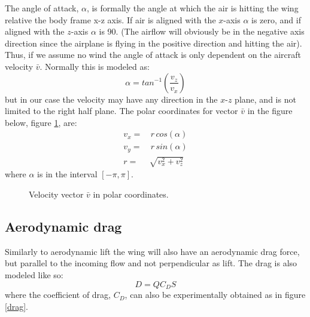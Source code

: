 The angle of attack, $\alpha$, is formally the angle at which the air is hitting the wing relative the body frame x-z axis.
If air is aligned with the $x$-axis $\alpha$ is zero, and if aligned with the $z$-axis $\alpha$ is 90.
(The airflow will obviously be in the negative axis direction since the airplane is flying in the positive direction and hitting the air).
Thus, if we assume no wind the angle of attack is only dependent on the aircraft velocity $\bar{v}$.
Normally this is modeled as:
\begin{equation}
    \alpha = tan^{-1}(\frac{v_z}{v_x})
    \label{eq:aoa}
\end{equation}
but in our case the velocity may have any direction in the $x$-$z$ plane, and is not limited to the right half plane.
The polar coordinates for vector $\bar{v}$ in the figure below, figure \ref{polar}, are:
\begin{equation}\begin{split}
    v_x =& \, r \, cos(\alpha) \\
    v_y =& \, r \, sin(\alpha) \\
    r =& \sqrt{v_x^2 + v_z^2}
    \label{eq:polar}
\end{split}\end{equation}
where $\alpha$ is in the interval $[-\pi,\pi]$.

\begin{figure}[h]
    \center
    
    \caption{Velocity vector $\bar{v}$ in polar coordinates.}
    \label{polar}
\end{figure}

\subsection{Aerodynamic drag}
Similarly to aerodynamic lift the wing will also have an aerodynamic drag force, but parallel to the incoming flow and not perpendicular as lift.
The drag is also modeled like so:
\begin{equation}
    D = Q C_D S
\end{equation}
where the coefficient of drag, $C_D$, can also be experimentally obtained as in figure \ref{drag}.


